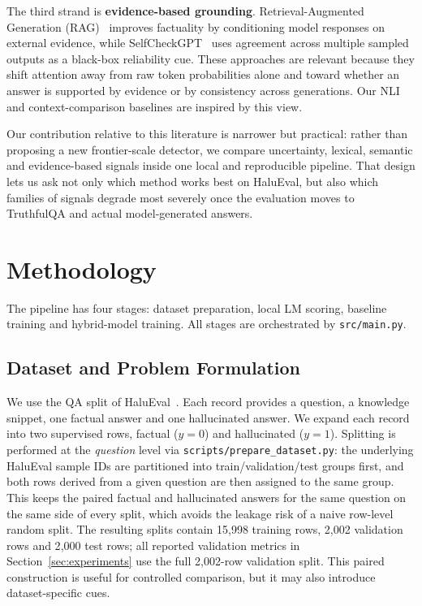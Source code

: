 \documentclass[conference]{IEEEtran}
\begin{document}
The third strand is \textbf{evidence-based grounding}. Retrieval-Augmented
Generation (RAG)~\cite{lewis2020rag} improves factuality by conditioning model
responses on external evidence, while SelfCheckGPT~\cite{manakul2023selfcheck}
uses agreement across multiple sampled outputs as a black-box reliability cue.
These approaches are relevant because they shift attention away from raw token
probabilities alone and toward whether an answer is supported by evidence or by
consistency across generations. Our NLI and context-comparison baselines are
inspired by this view.

Our contribution relative to this literature is narrower but practical: rather
than proposing a new frontier-scale detector, we compare uncertainty, lexical,
semantic and evidence-based signals inside one local and reproducible pipeline.
That design lets us ask not only which method works best on HaluEval, but also
which families of signals degrade most severely once the evaluation moves to
TruthfulQA and actual model-generated answers.

\section{Methodology}
\label{sec:method}

The pipeline has four stages: dataset preparation, local LM scoring, baseline training and hybrid-model training. All stages are orchestrated by \texttt{src/main.py}.

\subsection{Dataset and Problem Formulation}
\label{sec:data}

We use the QA split of HaluEval~\cite{li2023halueval}. Each record provides a question, a knowledge snippet, one factual answer and one hallucinated answer. We expand each record into two supervised rows, factual ($y=0$) and hallucinated ($y=1$). Splitting is performed at the \emph{question} level via \texttt{scripts/prepare\_dataset.py}: the underlying HaluEval sample IDs are partitioned into train/validation/test groups first, and both rows derived from a given question are then assigned to the same group. This keeps the paired factual and hallucinated answers for the same question on the same side of every split, which avoids the leakage risk of a naive row-level random split. The resulting splits contain 15{,}998 training rows, 2{,}002 validation rows and 2{,}000 test rows; all reported validation metrics in Section~\ref{sec:experiments} use the full 2{,}002-row validation split. This paired construction is useful for controlled comparison, but it may also introduce dataset-specific cues.
\end{document}
